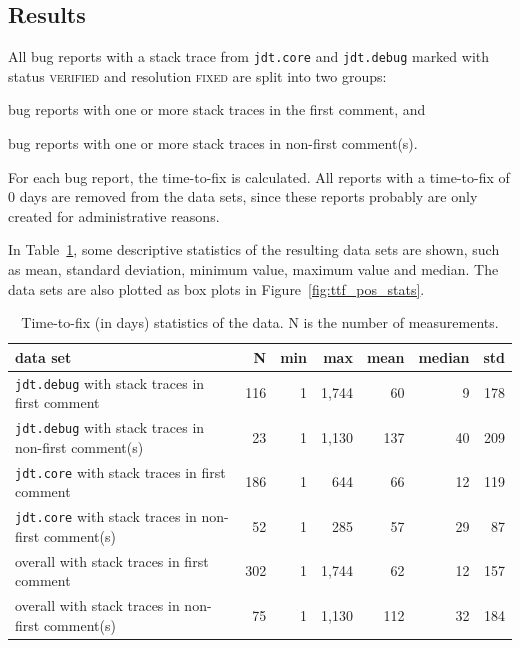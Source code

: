 \vspace{\baselineskip}
\hypbb{}

\subsection{Results} %
All bug reports with a stack trace from \texttt{jdt.core} and \texttt{jdt.debug} marked with status \textsc{verified} and resolution \textsc{fixed} are split into two groups: 

\begin{enumerate*}
	\item bug reports with one or more stack traces in the first comment, and
	\item bug reports with one or more stack traces in non-first comment(s).
\end{enumerate*}

For each bug report, the time-to-fix is calculated. All reports with a time-to-fix of $0$ days are removed from the data sets, since these reports probably are only created for administrative reasons.

In Table~\ref{tab:ttf_pos_stats}, some descriptive statistics of the resulting data sets are shown, such as mean, standard deviation, minimum value, maximum value and median. The data sets are also plotted as box plots in Figure~\ref{fig:ttf_pos_stats}.

\begin{table}[!ht]\footnotesize
	\centering
	\begin{tabular}{lrrrrrr}
		\toprule
		data set & N & min & max & mean & median & std \\
		\midrule
		\texttt{jdt.debug} with stack traces in first comment & 116 & 1 & 1,744 & 60 & 9 & 178 \\
		\texttt{jdt.debug} with stack traces in non-first comment(s) & 23 & 1 & 1,130 & 137 & 40 & 209 \\
		\texttt{jdt.core} with stack traces in first comment & 186 & 1 & 644 & 66 & 12 & 119 \\
		\texttt{jdt.core} with stack traces in non-first comment(s) & 52 & 1 & 285 & 57 & 29 & 87 \\
		overall with stack traces in first comment & 302 & 1 & 1,744 & 62 & 12 & 157 \\
		overall with stack traces in non-first comment(s) & 75 & 1 & 1,130 & 112 & 32 & 184 \\
		\bottomrule
	\end{tabular} 
	\caption{Time-to-fix (in days) statistics of the data. N is the number of measurements.}
	\label{tab:ttf_pos_stats}
\end{table}
 

